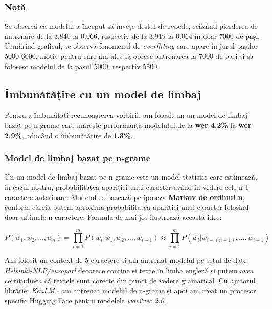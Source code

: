 \subsubsection{Notă}
Se observă că modelul a început să învețe destul de repede, scăzând pierderea de antrenare
de la 3.840 la 0.066, respectiv de la 3.919 la 0.064 în doar 7000 de pași. Urmărind graficul,
se observă fenomenul de \textit{overfitting} care apare în jurul pașilor 5000-6000, motiv
pentru care am ales să opresc antrenarea la 7000 de pași și sa folosesc modelul de
la pasul 5000, respectiv 5500.




\subsection{Îmbunătățire cu un model de limbaj}
Pentru a îmbunătăți recunoașterea vorbirii, am folosit un un model de limbaj bazat pe n-grame care 
mărește performanța modelului de la \textbf{wer 4.2\%}  la \textbf{wer 2.9\%}, aducând
o îmbunătățire de \textbf{1.3\%}.

\subsubsection{Model de limbaj bazat pe n-grame}
Un un model de limbaj bazat pe n-grame este un model statistic care estimează, în cazul nostru, probabilitatea
apariției unui caracter având în vedere cele n-1 caractere anterioare. Modelul se bazează pe
ipoteza \textbf{Markov de ordinul n}, conform căreia putem aproxima probabilitatea apariției unui caracter
folosind doar ultimele n caractere. Formula de mai jos ilustrează această idee:

\begin{equation}
    P(w_1, w_2, \ldots, w_n) = \prod_{i=1}^{m} P(w_i | w_{1}, w_{2}, \ldots, w_{i-1}) \approx \prod_{i=1}^{m} P(w_i | w_{i-(n-1)}, \ldots, w_{i-1})
\end{equation}
\vspace{1em}

\par
Am folosit un context de 5 caractere și am antrenat modelul pe
setul de date \textit{Helsinki-NLP/europarl} \cite{tiedemann-2012-parallel} deoarece conține și
texte în limba engleză și putem avea certitudinea că textele sunt corecte din punct de vedere
gramatical. Cu ajutorul librăriei \textit{KenLM} \cite{heafield-2011-kenlm}, am antrenat modelul
de n-grame și apoi am creat un procesor specific Hugging Face pentru modelele \textit{wav2vec 2.0}.

